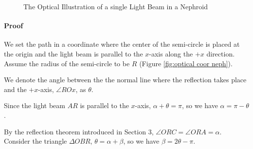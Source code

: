 \documentclass[a4paper]{article}
\begin{document}
\begin{figure}[!htbp] 
\centering 
{}
\caption{The Optical Illustration of a single Light Beam in a Nephroid} 
\end{figure}

\paragraph{Proof}
We set the path in a coordinate where the center of the semi-circle is placed at the origin and the light beam is parallel to the $x$-axis along the $+x$ direction. Assume the radius of the semi-circle to be $R$ (Figure \ref{fig:optical coor neph}).

We denote the angle between the the normal line where the reflection takes place and the $+x$-axis, $\angle ROx$, as $\theta$.

Since the light beam $AR$ is parallel to the $x$-axis, $\alpha + \theta = \pi$, so we have $\alpha = \pi - \theta$.

By the reflection theorem introduced in Section 3, $\angle ORC = \angle ORA = \alpha$. Consider the triangle $\Delta OBR$, $\theta = \alpha + \beta$, so we have $\beta = 2\theta - \pi$.
\end{document}
